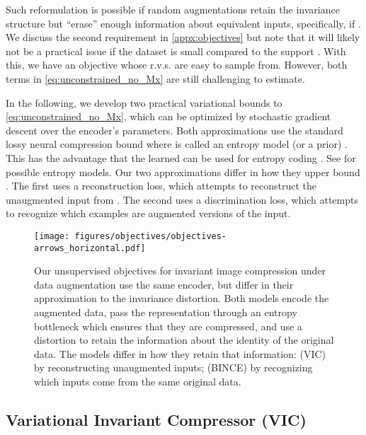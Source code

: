 \documentclass[final]{article}
\begin{document}
Such reformulation is possible if random augmentations retain the invariance structure  but ``erase'' enough information about equivalent inputs, specifically, if .
We discuss the second requirement in \cref{appx:objectives}  but note that it will likely not be a practical issue if the dataset is small compared to the support .
With this, we have an objective whose r.v.s. are easy to sample from. 
However, both terms in \cref{eq:unconstrained_no_Mx} are still challenging to estimate. 

In the following, we develop two practical variational bounds to \cref{eq:unconstrained_no_Mx}, which can be optimized by stochastic gradient descent \cite{bottou_large-scale_2010} over the encoder's parameters. Both approximations use the standard lossy neural compression bound
 where  is called an entropy model (or a prior) \cite{balle_end--end_2017,theis_lossy_2017}. This has the advantage that the learned  can be used for entropy coding  \cite{rissanen_generalized_1976,duda_asymmetric_2009}. See \citet{balle_variational_2018} for possible entropy models. Our two approximations differ in how they upper bound .
The first uses a reconstruction loss, which attempts to reconstruct the unaugmented input  from .
The second uses a discrimination loss, which attempts to recognize which examples are augmented versions of the input.












\begin{figure}
\centering
\texttt{[image: figures/objectives/objectives-arrows\_horizontal.pdf]}
\vspace*{-1.5em}
\caption{
Our unsupervised objectives for invariant image compression under data augmentation use the same encoder, but differ in their approximation to the invariance distortion.
Both models encode the augmented data, pass the representation through an entropy bottleneck which ensures that they are compressed, and use a distortion to retain the information about the identity of the original data.
The models differ in how they retain that information: 
(VIC) by reconstructing unaugmented inputs;
(BINCE) by recognizing which inputs come from the same original data. 
}\label{fig:objectives}
\vspace{-1\baselineskip}
\end{figure} 
\subsection{Variational Invariant Compressor (VIC)}
\end{document}
